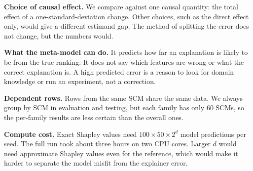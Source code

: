 \textbf{Choice of causal effect.} We compare against one causal quantity: the total effect of a one-standard-deviation change. Other choices, such as the direct effect only, would give a different estimand gap. The method of splitting the error does not change, but the numbers would.

\textbf{What the meta-model can do.} It predicts how far an explanation is likely to be from the true ranking. It does not say which features are wrong or what the correct explanation is. A high predicted error is a reason to look for domain knowledge or run an experiment, not a correction.

\textbf{Dependent rows.} Rows from the same SCM share the same data. We always group by SCM in evaluation and testing, but each family has only 60 SCMs, so the per-family results are less certain than the overall ones.

\textbf{Compute cost.} Exact Shapley values need $100 \times 50 \times 2^d$ model predictions per seed. The full run took about three hours on two CPU cores. Larger $d$ would need approximate Shapley values even for the reference, which would make it harder to separate the model misfit from the explainer error.

